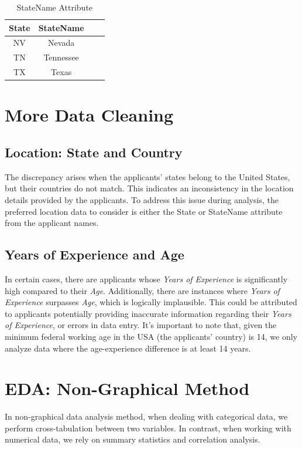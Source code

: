 \documentclass[journal]{IEEEtai}
\begin{document}
\begin{table}[htbp]
  \centering
  \caption{StateName Attribute}
    \begin{tabular}{c c c c}
    \hline
    State & StateName \\
    \hline
    NV & Nevada \\
    TN & Tennessee \\
    TX & Texas \\
    \hline
  \end{tabular}
\end{table}

\section{More Data Cleaning}
\subsection{Location: State and Country}
The discrepancy arises when the applicants' states belong to the United States, but their countries do not match. This indicates an inconsistency in the location details provided by the applicants. To address this issue during analysis, the preferred location data to consider is either the State or StateName attribute from the applicant names.

\subsection{Years of Experience and Age}
In certain cases, there are applicants whose {\it Years of Experience} is significantly high compared to their {\it Age}. Additionally, there are instances where {\it Years of Experience} surpasses {\it Age}, which is logically implausible. This could be attributed to applicants potentially providing inaccurate information regarding their {\it Years of Experience}, or errors in data entry. It's important to note that, given the minimum federal working age in the USA (the applicants' country) is 14, we only analyze data where the age-experience difference is at least 14 years.



\section{EDA: Non-Graphical Method}
In non-graphical data analysis method, when dealing with categorical data, we perform cross-tabulation between two variables. In contrast, when working with numerical data, we rely on summary statistics and correlation analysis.
\end{document}
